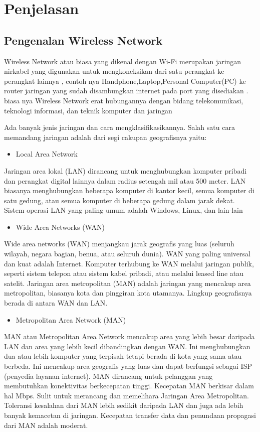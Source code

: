 \documentclass[conference]{IEEEtran}
\begin{document}
\section{Penjelasan}
\subsection{Pengenalan Wireless Network}


Wireless Network atau biasa yang dikenal dengan Wi-Fi merupakan jaringan nirkabel yang digunakan
untuk mengkoneksikan dari satu perangkat ke perangkat lainnya ,
contoh nya Handphone,Laptop,Personal Computer(PC)
ke router jaringan yang sudah disambungkan internet pada port yang disediakan . biasa nya Wireless Network  
erat hubungannya dengan bidang telekomunikasi, teknologi informasi, dan teknik komputer dan jaringan 



Ada banyak jenis jaringan dan cara mengklasifikasikannya. Salah satu cara memandang jaringan adalah dari segi cakupan geografisnya yaitu:

\begin{itemize}
    \item Local Area Network
\end{itemize}

Jaringan area lokal (LAN) dirancang untuk menghubungkan komputer pribadi dan perangkat digital lainnya dalam radius setengah mil atau 500 meter. 
LAN biasanya menghubungkan beberapa komputer di kantor kecil, semua komputer di satu gedung, atau semua komputer di beberapa gedung dalam jarak dekat.
Sistem operasi LAN yang paling umum adalah Windows, Linux, dan lain-lain

\begin{itemize}
    \item Wide Area Networks (WAN)
\end{itemize}
Wide area networks (WAN) menjangkau jarak geografis yang luas (seluruh wilayah, negara bagian, benua, atau seluruh dunia). 
WAN yang paling universal dan kuat adalah Internet.
Komputer terhubung ke WAN melalui jaringan publik, seperti sistem telepon atau sistem kabel pribadi, atau melalui leased line atau satelit. 
Jaringan area metropolitan (MAN) adalah jaringan yang mencakup area metropolitan, biasanya kota dan pinggiran kota utamanya. 
Lingkup geografisnya berada di antara WAN dan LAN.

\begin{itemize}
    \item Metropolitan Area Network (MAN)
\end{itemize}
MAN atau Metropolitan Area Network mencakup area yang lebih besar daripada LAN dan area yang lebih kecil dibandingkan dengan WAN.
Ini menghubungkan dua atau lebih komputer yang terpisah tetapi berada di kota yang sama atau berbeda. 
Ini mencakup area geografis yang luas dan dapat berfungsi sebagai ISP (penyedia layanan internet).
MAN dirancang untuk pelanggan yang membutuhkan konektivitas berkecepatan tinggi.
Kecepatan MAN berkisar dalam hal Mbps. Sulit untuk merancang dan memelihara Jaringan Area Metropolitan. 
Toleransi kesalahan dari MAN lebih sedikit daripada LAN dan juga ada lebih banyak kemacetan di jaringan.
Kecepatan transfer data dan penundaan propagasi dari MAN adalah moderat.
\end{document}
